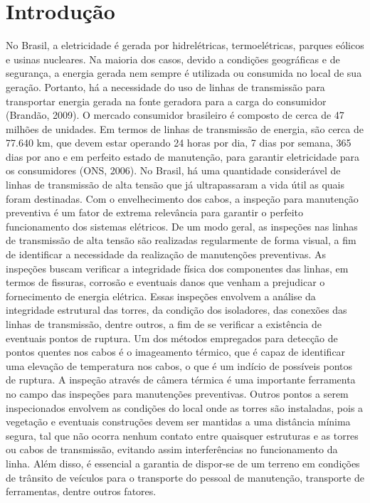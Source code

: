 \chapter{Introdução}
No Brasil, a eletricidade é gerada por hidrelétricas, termoelétricas, parques eólicos e usinas nucleares. Na maioria dos casos, devido a condições geográficas e de segurança, a energia gerada nem sempre é utilizada ou consumida no local de sua geração. Portanto, há a necessidade do uso de linhas de transmissão para transportar energia gerada na fonte geradora para a carga do consumidor (Brandão, 2009). O mercado consumidor brasileiro é composto de cerca de 47 milhões de unidades. Em termos de linhas de transmissão de energia, são cerca de 77.640 km, que devem estar operando 24 horas por dia, 7 dias por semana, 365 dias por ano e em perfeito estado de manutenção, para garantir eletricidade para os consumidores (ONS, 2006).
No Brasil, há uma quantidade considerável de linhas de transmissão de alta tensão que já ultrapassaram a vida útil as quais foram destinadas. Com o envelhecimento dos cabos, a inspeção para manutenção preventiva é um fator de extrema relevância para garantir o perfeito funcionamento dos sistemas elétricos. 
De um modo geral, as inspeções nas linhas de transmissão de alta tensão são realizadas regularmente de forma visual, a fim de identificar a necessidade da realização de manutenções preventivas. 
As inspeções buscam verificar a integridade física dos componentes das linhas, em termos de fissuras, corrosão e eventuais danos que venham a prejudicar o fornecimento de energia elétrica. Essas inspeções envolvem a análise da integridade estrutural das torres, da condição dos isoladores, das conexões das linhas de transmissão, dentre outros, a fim de se verificar a existência de eventuais pontos de ruptura. 
Um dos métodos empregados para detecção de pontos quentes nos cabos é o imageamento térmico, que é capaz de identificar uma elevação de temperatura nos cabos, o que é um indício de possíveis pontos de ruptura. A inspeção através de câmera térmica é uma importante ferramenta no campo das inspeções para manutenções preventivas. 
Outros pontos a serem inspecionados envolvem as condições do local onde as torres são instaladas, pois a vegetação e eventuais construções devem ser mantidas a uma distância mínima segura, tal que não ocorra nenhum contato entre quaisquer estruturas e as torres ou cabos de transmissão, evitando assim interferências no funcionamento da linha. 
Além disso, é essencial a garantia de dispor-se de um terreno em condições de trânsito de veículos para o transporte do pessoal de manutenção, transporte de ferramentas, dentre outros fatores. 
